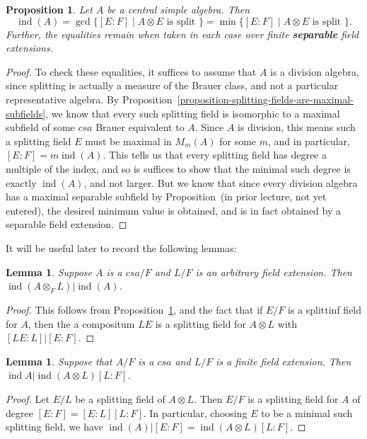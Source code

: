\documentclass[12pt]{report}
\theoremstyle{plain}
\newtheorem{lem}[thm]{Lemma}
\newtheorem{prop}[thm]{Proposition}
\newcommand{\oper}[1]{\operatorname{#1}}
\newcommand{\ind}{\oper{ind}}
\newcommand{\todo}[1]{\textcolor{todo}{#1}}
\begin{document}
\begin{prop} \label{proposition-index-via-splitting-fields}
Let $A$ be a central simple algebra. Then
\[\ind(A) = \gcd\{[E:F] \mid A \otimes E \text{ is split }\} = \min\{[E:F]
\mid A \otimes E \text{ is split }\}.\]
Further, the equalities remain when taken in each case over finite
\textbf{separable} field extensions.
\end{prop}
\begin{proof}
To check these equalities, it suffices to assume that $A$ is a division
algebra, since splitting is actually a measure of the Brauer class, and not
a particular representative algebra. By
Proposition~\ref{proposition-splitting-fields-are-maximal-subfields}, we
know that every such splitting field is isomorphic to a maximal subfield of
some $csa$ Brauer equivalent to $A$. Since $A$ is division, this means such
a splitting field $E$ must be maximal in $M_m(A)$ for some $m$, and in
particular, $[E:F] = m \ind(A)$. This tells us that every splitting field
has degree a multiple of the index, and so is suffices to show that the
minimal such degree is exactly $\ind(A)$, and not larger. But we know that
since every division algebra has a maximal separable subfield by
Proposition~\todo{(in prior lecture, not yet entered)}, the desired minimum
value is obtained, and is in fact obtained by a separable field extension.
\end{proof}

It will be useful later to record the following lemmas:

\begin{lem}
Suppose $A$ is a $csa/F$ and $L/F$ is an arbitrary field extension. Then
$\ind(A \otimes_F L) | \ind(A)$.
\end{lem}
\begin{proof}
This follows from Proposition~\ref{proposition-index-via-splitting-fields},
and the fact that if $E/F$ is a splittinf field for $A$, then the a
compositum $LE$ is a splitting field for $A \otimes L$ with $[LE: L] |
[E:F]$.
\end{proof}

\begin{lem} \label{index restriction}
Suppose that $A/F$ is a $csa$ and $L/F$ is a finite field extension. Then
$\ind A | \ind (A \otimes L) [L:F]$.
\end{lem}
\begin{proof}
Let $E/L$ be a splitting field of $A \otimes L$. Then $E/F$ is a splitting
field for $A$ of degree $[E:F] =[E:L][L:F]$. In particular, choosing $E$ to
be a minimal such splitting field, we have $\ind(A) | [E:F] = \ind(A
\otimes L) [L:F]$.
\end{proof}
\end{document}
